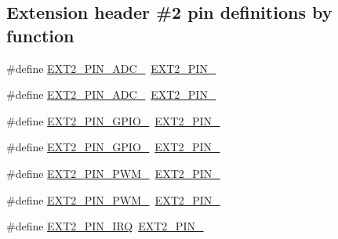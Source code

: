 \subsection*{Extension header \#2 pin definitions by function}
\begin{DoxyCompactItemize}
\item 
\#define \mbox{\hyperlink{group__samd21__xplained__pro__features__group_ga7ef96b70de24c438e1d8599aed047afa}{E\+X\+T2\+\_\+\+P\+I\+N\+\_\+\+A\+D\+C\+\_}}~\mbox{\hyperlink{group__samd21__xplained__pro__features__group_ga2aeb3f2ed8db08dc322578ab038f9956}{E\+X\+T2\+\_\+\+P\+I\+N\+\_}}
\item 
\#define \mbox{\hyperlink{group__samd21__xplained__pro__features__group_gab3b8dfec060b4a077603a27e8c603a94}{E\+X\+T2\+\_\+\+P\+I\+N\+\_\+\+A\+D\+C\+\_}}~\mbox{\hyperlink{group__samd21__xplained__pro__features__group_ga22572d5f0c2876377fe62f0a7c28195f}{E\+X\+T2\+\_\+\+P\+I\+N\+\_}}
\item 
\#define \mbox{\hyperlink{group__samd21__xplained__pro__features__group_ga5f54bd174047d0d8edaf586b61f65c63}{E\+X\+T2\+\_\+\+P\+I\+N\+\_\+\+G\+P\+I\+O\+\_}}~\mbox{\hyperlink{group__samd21__xplained__pro__features__group_gaa52e8320e78bf06a8f93ea43b4f1b150}{E\+X\+T2\+\_\+\+P\+I\+N\+\_}}
\item 
\#define \mbox{\hyperlink{group__samd21__xplained__pro__features__group_gaf648c02c3ac7022386a3d594031c91c8}{E\+X\+T2\+\_\+\+P\+I\+N\+\_\+\+G\+P\+I\+O\+\_}}~\mbox{\hyperlink{group__samd21__xplained__pro__features__group_gac3b50faec712d1e3f555eb501d4626f8}{E\+X\+T2\+\_\+\+P\+I\+N\+\_}}
\item 
\#define \mbox{\hyperlink{group__samd21__xplained__pro__features__group_ga15df54ae8400cddf7a8c6b87710af422}{E\+X\+T2\+\_\+\+P\+I\+N\+\_\+\+P\+W\+M\+\_}}~\mbox{\hyperlink{group__samd21__xplained__pro__features__group_ga992fafe0d99a8dcebb6f6c93b9f8dd8d}{E\+X\+T2\+\_\+\+P\+I\+N\+\_}}
\item 
\#define \mbox{\hyperlink{group__samd21__xplained__pro__features__group_ga1ee67a82e37423527e9a7438e2a2d5f4}{E\+X\+T2\+\_\+\+P\+I\+N\+\_\+\+P\+W\+M\+\_}}~\mbox{\hyperlink{group__samd21__xplained__pro__features__group_gab7ec1f0caf30f1b99e5555fdc391733d}{E\+X\+T2\+\_\+\+P\+I\+N\+\_}}
\item 
\#define \mbox{\hyperlink{group__samd21__xplained__pro__features__group_gaf6221991474f801dbf1976dba2dca985}{E\+X\+T2\+\_\+\+P\+I\+N\+\_\+\+I\+RQ}}~\mbox{\hyperlink{group__samd21__xplained__pro__features__group_ga4654d52b9352ac9e1cade0d2014e3a6b}{E\+X\+T2\+\_\+\+P\+I\+N\+\_}}

\end{DoxyCompactItemize}
